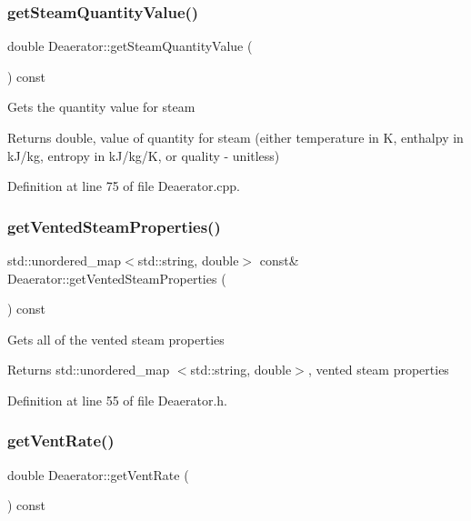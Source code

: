 \subsubsection{\texorpdfstring{get\+Steam\+Quantity\+Value()}{getSteamQuantityValue()}}
{\footnotesize\ttfamily double Deaerator\+::get\+Steam\+Quantity\+Value (\begin{DoxyParamCaption}{ }\end{DoxyParamCaption}) const}

Gets the quantity value for steam \begin{DoxyReturn}{Returns}
double, value of quantity for steam (either temperature in K, enthalpy in k\+J/kg, entropy in k\+J/kg/K, or quality -\/ unitless) 
\end{DoxyReturn}


Definition at line 75 of file Deaerator.\+cpp.

\mbox{\label{class_deaerator_aba77ebc41e5b05d6e2463793bacbcbc0}} 
\subsubsection{\texorpdfstring{get\+Vented\+Steam\+Properties()}{getVentedSteamProperties()}}
{\footnotesize\ttfamily std\+::unordered\+\_\+map$<$std\+::string, double$>$ const\& Deaerator\+::get\+Vented\+Steam\+Properties (\begin{DoxyParamCaption}{ }\end{DoxyParamCaption}) const\hspace{0.3cm}{\ttfamily [inline]}}

Gets all of the vented steam properties \begin{DoxyReturn}{Returns}
std\+::unordered\+\_\+map $<$std\+::string, double$>$, vented steam properties 
\end{DoxyReturn}


Definition at line 55 of file Deaerator.\+h.

\mbox{\label{class_deaerator_ad0262491c2bd9a6f820eaaba54498bcd}} 
\subsubsection{\texorpdfstring{get\+Vent\+Rate()}{getVentRate()}}
{\footnotesize\ttfamily double Deaerator\+::get\+Vent\+Rate (\begin{DoxyParamCaption}{ }\end{DoxyParamCaption}) const}

